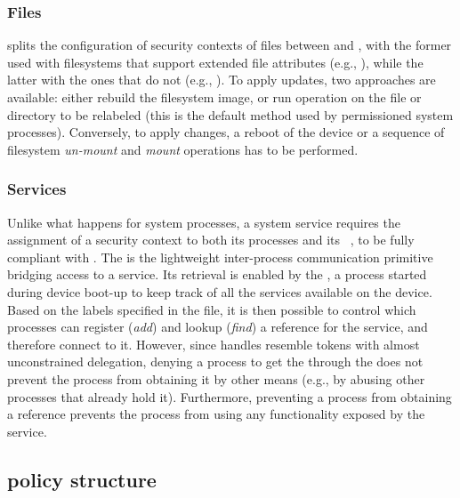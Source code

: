 \subsubsection{Files}

\sel splits the configuration of security contexts of files between
\filecontexts and \genfscontexts, with the former used with
filesystems that support extended file attributes (e.g., \data), while
the latter with the ones that do not (e.g., \proc).  To apply
\filecontexts updates, two approaches are available: either rebuild
the filesystem image, or run \restorecon operation on the file or
directory to be relabeled (this is the default method used by
permissioned system processes).  Conversely, to apply \genfscontexts
changes, a reboot of the device or a sequence of filesystem {\em
  un-mount} and {\em mount} operations has to be performed.

\subsubsection{Services}

Unlike what happens for system processes, a system service requires
the assignment of a security context to both its processes and its
\binder~\cite{seapp_binder}, to be fully compliant with \sea.  The
\binder is the lightweight inter-process communication primitive
bridging access to a service.  Its retrieval is enabled by the
\servicemanager, a process started during device boot-up to keep track
of all the services available on the device.  Based on the labels
specified in the \servicecontexts file, it is then possible to control
which processes can register ({\em add}) and lookup ({\em find}) a
\binder reference for the service, and therefore connect to it.
However, since \binder handles resemble tokens with almost
unconstrained delegation, denying a process to get the \binder through
the \servicemanager does not prevent the process from obtaining it by
other means (e.g., by abusing other processes that already hold it).
Furthermore, preventing a process from obtaining a \binder reference
prevents the process from using any functionality exposed by the
service.

\subsection{\seapp policy structure}\label{subsect:seapp_structure}

